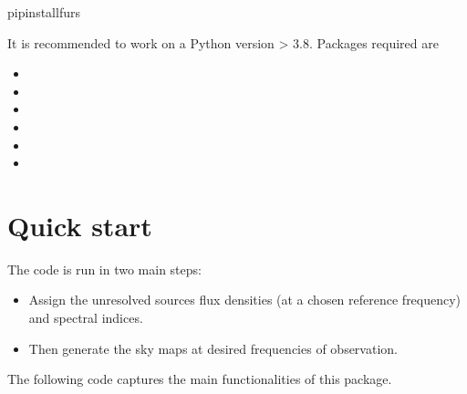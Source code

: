 \documentclass[letterpaper,10pt,english]{sphinxmanual}
\begin{document}
\begin{sphinxVerbatim}[commandchars=\\\{\}]
pipinstallfurs
\end{sphinxVerbatim}

\sphinxAtStartPar
It is recommended to work on a Python version \textgreater{} 3.8. Packages required are
\begin{itemize}
\item {} 
\sphinxAtStartPar
{}

\item {} 
\sphinxAtStartPar
{}

\item {} 
\sphinxAtStartPar
{}

\item {} 
\sphinxAtStartPar
{}

\item {} 
\sphinxAtStartPar
{}

\item {} 
\sphinxAtStartPar
{}

\end{itemize}


\section{Quick start}
\label{\detokenize{basics:quick-start}}
\sphinxAtStartPar
The code is run in two main steps:
\begin{itemize}
\item {} 
\sphinxAtStartPar
Assign the unresolved sources flux densities (at a chosen reference frequency) and spectral indices.

\item {} 
\sphinxAtStartPar
Then generate the sky maps at desired frequencies of observation.

\end{itemize}

\sphinxAtStartPar
The following code captures the main functionalities of this package.
\end{document}
